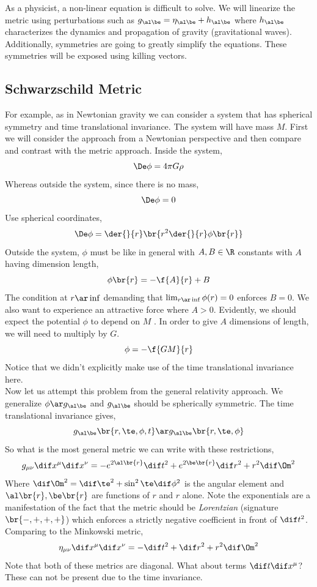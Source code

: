 \documentclass{article}
\begin{document}
As a physicist, a non-linear equation is difficult to solve. We will linearize the metric using perturbations such as $g_{\al\be} = \eta_{\al\be} + h_{\al\be}$ where $h_{\al\be}$ characterizes the dynamics and propagation of gravity (gravitational waves).\\

Additionally, symmetries are going to greatly simplify the equations. These symmetries will be exposed using killing vectors. \\

\subsection{Schwarzschild Metric}
For example, as in Newtonian gravity we can consider a system that has spherical symmetry and time translational invariance. The system will have mass $M$. First we will consider the approach from a Newtonian perspective and then compare and contrast with the metric approach. Inside the system,
\[ \De \phi = 4 \pi G \rho \]
Whereas outside the system, since there is no mass,
\[ \De \phi = 0  \]
Use spherical coordinates,
\[ \De \phi = \der{}{r}\br{r^2 \der{}{r} \phi \br{r}} \]
Outside the system, $\phi$ must be like in general with $A,B \in \R$ constants with $A$ having dimension length,
\[ \phi\br{r} = - \f{A}{r} + B \]
The condition at $r \ar \inf$ demanding that $\lim_{r\ar\inf}\phi(r) = 0$ enforces $B = 0$. We also want to experience an attractive force where $A > 0$. Evidently, we should expect the potential $\phi$ to depend on $M$ . In order to give $A$ dimensions of length, we will need to multiply by $G$.
\[ \phi = - \f{GM}{r} \]
Notice that we didn't explicitly make use of the time translational invariance here.\\

Now let us attempt this problem from the general relativity approach. We generalize $\phi \ar g_{\al\be}$ and $g_{\al\be}$ should be spherically symmetric. The time translational invariance gives,
\[ g_{\al\be}\br{r, \te, \phi, t} \ar g_{\al\be}\br{r, \te, \phi} \]
So what is the most general metric we can write with these restrictions,
\[  g_{\mu\nu} \dif x^\mu \dif x^\nu = - e^{2\al\br{r}} \dif t^2 + e^{2\be\br{r}} \dif r^2 + r^2 \dif\Om^2\]
Where $\dif \Om^2 = \dif \te^2 + \sin^2 \te \dif \phi^2$ is the angular element and $\al\br{r},\be\br{r}$ are functions of $r$ and $r$ alone. Note the exponentials are a manifestation of the fact that the metric should be \textit{Lorentzian} (signature $\br{-,+,+,+}$) which enforces a strictly negative coefficient in front of $\dif t^2$. Comparing to the Minkowski metric,
\[ \eta_{\mu\nu} \dif x^\mu  \dif x^\nu = -\dif t^2 + \dif r^2 + r^2 \dif \Om^2\]
Note that both of these metrics are diagonal. What about terms $\dif t \dif x^\mu$? These can not be present due to the time invariance. \\
\end{document}
